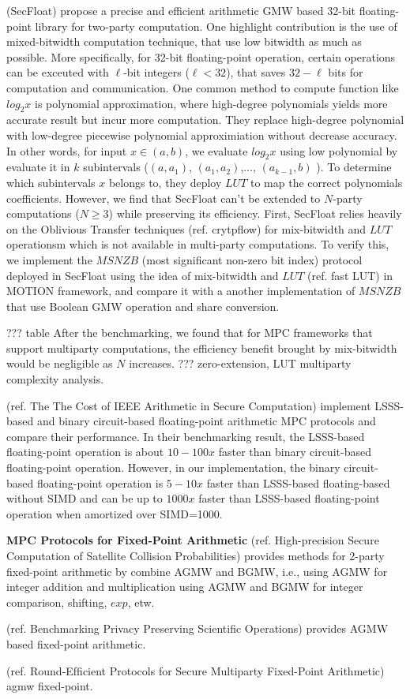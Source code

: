 (SecFloat) propose a precise and efficient arithmetic GMW based 32-bit floating-point library for two-party computation. One highlight contribution is the use of mixed-bitwidth computation technique, that use low bitwidth as much as possible. More specifically, for 32-bit floating-point operation, certain operations can be exceuted with $\ell$-bit integers ($\ell <32$), that saves $32-\ell$ bits for computation and communication. One common method to compute function like $log_{2}x$ is polynomial approximation, where high-degree polynomials yields more accurate result but incur more computation. They replace high-degree polynomial with low-degree piecewise polynomial approximiation without decrease accuracy. In other words, for input $x\in \left(a,b\right) $, we evaluate $log_2 x$ using low polynomial by evaluate it in $k$ subintervals ($\left(a, a_1\right) $, $\left(a_1, a_2\right)  $,$\ldots$, $\left(a_{k-1}, b\right) $  ). To determine which subintervals $x$ belongs to, they deploy $LUT$ to map the correct polynomials coefficients. However, we find that SecFloat can't be extended to $N$-party computations ($N\geq 3$) while preserving its efficiency. First, SecFloat relies heavily on the Oblivious Transfer techniques (ref. crytpflow) for mix-bitwidth and $LUT$ operationsm which is not available in multi-party computations. To verify this, we implement the $MSNZB$ (most significant non-zero bit index) protocol deployed in SecFloat using the idea of mix-bitwidth and $LUT$ (ref. fast LUT) in MOTION framework, and compare it with a another implementation of $MSNZB$ that use Boolean GMW operation and share conversion. 

??? table
After the benchmarking, we found that for MPC frameworks that support multiparty computations, the efficiency benefit brought by mix-bitwidth would be negligible as $N$ increases. ??? zero-extension, LUT multiparty complexity analysis. 



(ref. The The Cost of IEEE Arithmetic in Secure Computation) implement LSSS-based and binary circuit-based floating-point arithmetic MPC protocols and compare their performance. In their benchmarking result, the LSSS-based floating-point operation is about $10-100x$ faster than binary circuit-based floating-point operation. However, in our implementation, the binary circuit-based floating-point operation is $5-10x$ faster than LSSS-based floating-based without SIMD and can be up to $1000x$ faster than LSSS-based floating-point operation when amortized over SIMD=1000.

\textbf{MPC Protocols for Fixed-Point Arithmetic}
(ref. High-precision Secure Computation of Satellite Collision Probabilities) provides methods for 2-party fixed-point arithmetic by combine AGMW and BGMW, i.e., using AGMW for integer addition and multiplication using AGMW and BGMW for integer comparison, shifting, $exp$, etw. 

(ref.  Benchmarking Privacy Preserving Scientific Operations) provides AGMW based fixed-point arithmetic. 

(ref. Round-Efﬁcient Protocols for Secure Multiparty Fixed-Point Arithmetic) agmw fixed-point. 






